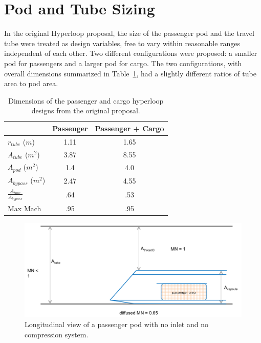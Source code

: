 \documentclass[heading.tex]{subfiles}
\begin{document}
\section{Pod and Tube Sizing}
\label{s:sizing}

In the original Hyperloop proposal, the size of the passenger pod and the travel tube were treated as design variables, 
free to vary within reasonable ranges independent of each other. Two different configurations were proposed: a smaller 
pod for passengers and a larger pod for cargo. The two configurations, with overall dimensions summarized 
in Table~\ref{t:hyperbase}, had a slightly different ratios of tube area to pod area. 

\begin{table}
  \centering
  \caption{Dimensions of the passenger and cargo hyperloop designs from the original proposal. }
  \label{t:hyperbase}
  \begin{tabular}{l c c}
    \hline
                                  &  Passenger       & Passenger + Cargo \\ \hline
    $r_{tube}$ ($m$)              &        1.11      &     1.65  \\
    $A_{tube}$  ($m^2$)           &        3.87      &     8.55  \\
    $A_{pod}$ ($m^2$)             &        1.4       &     4.0   \\ 
    $A_{bypass}$ ($m^2$)          &        2.47      &     4.55  \\ 
    $\frac{A_{tube}}{A_{bypass}}$ &        .64       &     .53   \\
    Max Mach                      &        .95       &     .95   \\
    \hline
  \end{tabular}
\end{table}

\begin{figure}[hbtp]
\centering
\includegraphics[width=.85\textwidth]{images/closedCapsule}
\caption{Longitudinal view of a passenger pod with no inlet and no compression system.}
\label{f:ClosedPod}
\end{figure}
\end{document}
